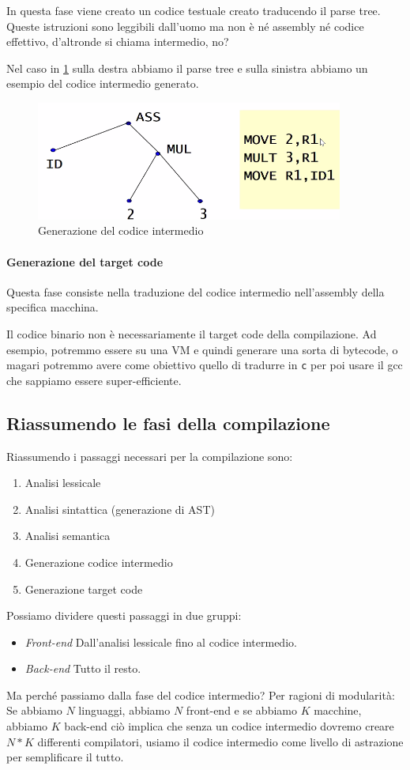 \documentclass[class=book, crop=false, oneside, 12pt]{standalone}
\begin{document}
In questa fase viene creato un codice testuale creato traducendo il parse tree. Queste istruzioni sono leggibili dall’uomo ma non è né assembly né codice effettivo, d’altronde si chiama intermedio, no?

Nel caso in \ref{codice_intermedio} sulla destra abbiamo il parse tree e sulla sinistra abbiamo un esempio del codice intermedio generato.
\begin{figure}[H]
	\centering
	\includegraphics[width=0.9\textwidth,keepaspectratio]{codice_intermedio}
	\caption{Generazione del codice intermedio}
	\label{codice_intermedio}
\end{figure}

\paragraph{Generazione del target code}
Questa fase consiste nella traduzione del codice intermedio nell’assembly della specifica macchina.

Il codice binario non è necessariamente il target code della compilazione. Ad esempio, potremmo essere su una VM e quindi generare una sorta di bytecode, o magari potremmo avere come obiettivo quello di tradurre in \texttt{c} per poi usare il gcc che sappiamo essere super-efficiente.


\subsection{Riassumendo le fasi della compilazione}
Riassumendo i passaggi necessari per la compilazione sono:
\begin{enumerate}
    \item Analisi lessicale
    \item Analisi sintattica (generazione di AST)
    \item Analisi semantica
    \item Generazione codice intermedio
    \item Generazione target code
\end{enumerate}
Possiamo dividere questi passaggi in due gruppi:
\begin{itemize}[]
    \item \emph{Front-end} Dall’analisi lessicale fino al codice intermedio.
    \item \emph{Back-end} Tutto il resto.
\end{itemize}

Ma perché passiamo dalla fase del codice intermedio? Per ragioni di modularità:
Se abbiamo $N$ linguaggi, abbiamo $N$ front-end e se abbiamo $K$ macchine, abbiamo $K$ back-end ciò implica che senza un codice intermedio dovremo creare $N*K$ differenti compilatori, usiamo il codice intermedio come livello di astrazione per semplificare il tutto. 
\end{document}
